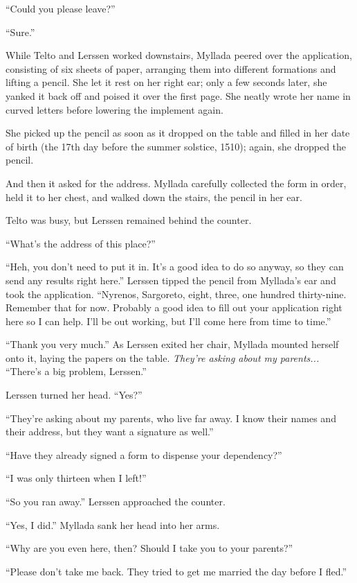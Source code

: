 ``Could you please leave?''

``Sure.''

\centeredstars

While Telto and Lerssen worked downstairs, Myllada peered over the application, consisting of six sheets of paper, arranging them into different formations and lifting a pencil. She let it rest on her right ear; only a few seconds later, she yanked it back off and poised it over the first page. She neatly wrote her name in curved letters before lowering the implement again.

She picked up the pencil as soon as it dropped on the table and filled in her date of birth (the 17th day before the summer solstice, 1510); again, she dropped the pencil.

And then it asked for the address. Myllada carefully collected the form in order, held it to her chest, and walked down the stairs, the pencil in her ear.

Telto was busy, but Lerssen remained behind the counter.

``What's the address of this place?''

``Heh, you don't need to put it in. It's a good idea to do so anyway, so they can send any results right here.'' Lerssen tipped the pencil from Myllada's ear and took the application. ``Nyrenos, Sargoreto, eight, three, one hundred thirty-nine. Remember that for now. Probably a good idea to fill out your application right here so I can help. I'll be out working, but I'll come here from time to time.''

``Thank you very much.'' As Lerssen exited her chair, Myllada mounted herself onto it, laying the papers on the table. \emph{They're asking about my parents...} ``There's a big problem, Lerssen.''

Lerssen turned her head. ``Yes?''

``They're asking about my parents, who live far away. I know their names and their address, but they want a signature as well.''

``Have they already signed a form to dispense your dependency?''

``I was only thirteen when I left!''

``So you ran away.'' Lerssen approached the counter.

``Yes, I did.'' Myllada sank her head into her arms.

``Why are you even here, then? Should I take you to your parents?''

``Please don't take me back. They tried to get me married the day before I fled.''

